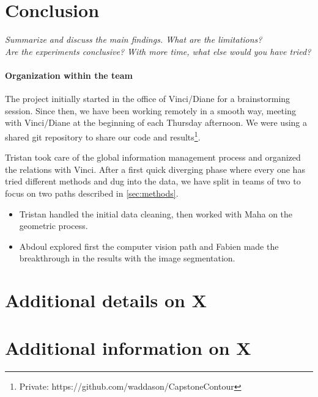 \documentclass[11pt]{article}
\begin{document}
\section{Conclusion}
\textit{Summarize and discuss the main findings. What are the limitations?\\
Are the experiments conclusive? With more time, what else would you have tried?}

\paragraph{Organization within the team}
The project initially started in the office of Vinci/Diane for a brainstorming session.
Since then, we have been working remotely in a smooth way, meeting with 
Vinci/Diane at the beginning of each Thursday afternoon. We were using a shared 
git repository to share our code and results\footnote{Private: https://github.com/waddason/CapstoneContour}.

Tristan took care of the global information management process and organized the
relations with Vinci. After a first quick diverging phase where every one has 
tried different methods and dug into the data,  we have split in teams of two 
to focus on two paths described in \cref{sec:methods}. 
\begin{itemize}
    \item Tristan handled the initial data cleaning, then worked with Maha on 
    the geometric process.
    \item Abdoul explored first the computer vision path and Fabien made the 
    breakthrough in the results with the image segmentation.
\end{itemize}






\appendix

\newpage
\section{Additional details on X}
\label{app:sec:details}

\section{Additional information on X}
\end{document}
